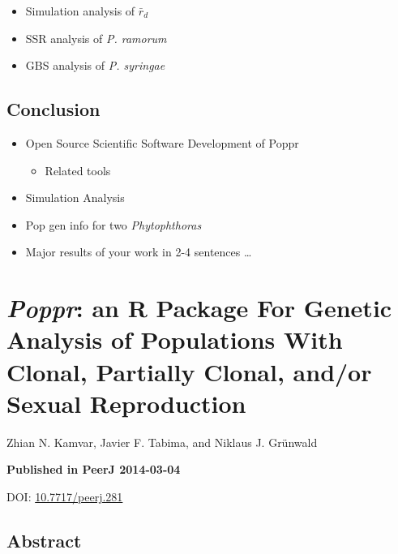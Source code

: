 \documentclass[double,12pt]{beavtex}
\providecommand{\tightlist}{%
  \setlength{\itemsep}{0pt}\setlength{\parskip}{0pt}}
\begin{document}
  \begin{itemize}
  \tightlist
  \item
    Simulation analysis of \(\bar{r}_d\)
  \item
    SSR analysis of \emph{P. ramorum}
  \item
    GBS analysis of \emph{P. syringae}
  \end{itemize}
  
  \section{Conclusion}\label{conclusion}
  
  \begin{itemize}
  \tightlist
  \item
    Open Source Scientific Software Development of Poppr
  
    \begin{itemize}
    \tightlist
    \item
      Related tools
    \end{itemize}
  \item
    Simulation Analysis
  \item
    Pop gen info for two \emph{Phytophthoras}
  \item
    Major results of your work in 2-4 sentences \ldots{}
  \end{itemize}
  
  \chapter{\texorpdfstring{\emph{Poppr}: an R Package For Genetic Analysis
  of Populations With Clonal, Partially Clonal, and/or Sexual
  Reproduction}{Poppr: an R Package For Genetic Analysis of Populations With Clonal, Partially Clonal, and/or Sexual Reproduction}}\label{poppr-an-r-package-for-genetic-analysis-of-populations-with-clonal-partially-clonal-andor-sexual-reproduction}
  
  Zhian N. Kamvar, Javier F. Tabima, and Niklaus J. Grünwald
  
  \vspace*{\fill}
  
  \textbf{Published in PeerJ 2014-03-04}
  
  DOI: \href{https://dx.doi.org/10.7717/peerj.281}{10.7717/peerj.281}
  
  \newpage
  
  \section{Abstract}\label{abstract}
  
\end{document}
